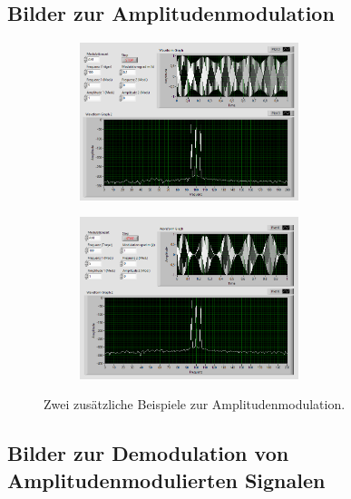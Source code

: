 \subsection{Bilder zur Amplitudenmodulation}

\begin{figure}[H]
	\centering
	\begin{subfigure}[c]{\textwidth}
		\centering
		\includegraphics[width=0.7\textwidth]{pic/am_anhang_1.png}
	\end{subfigure}
	\begin{subfigure}[c]{\textwidth}
		\centering
		\includegraphics[width=0.7\textwidth]{pic/am_anhang_2.png}
	\end{subfigure}	
	\caption{Zwei zusätzliche Beispiele zur Amplitudenmodulation.}
	\label{fig:a1}	
\end{figure}

\subsection{Bilder zur Demodulation von Amplitudenmodulierten Signalen}

